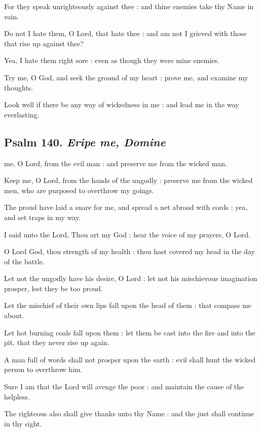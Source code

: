 For they speak unrighteously against thee : and thine enemies take thy Name in vain.\par
{}Do not I hate them, O Lord, that hate thee : and am not I grieved with those that rise up against thee?\par
{}Yea, I hate them right sore : even as though they were mine enemies.\par
{}Try me, O God, and seek the ground of my heart : prove me, and examine my thoughts.\par
{}Look well if there be any way of wickedness in me : and lead me in the way everlasting.\par

\subsection{Psalm 140. \textit{Eripe me, Domine}}

 me, O Lord, from the evil man : and preserve me from the wicked man.\par
{}
Keep me, O Lord, from the hands of the ungodly : preserve me from the wicked men, who are purposed to overthrow my goings.\par
{}The proud have laid a snare for me, and spread a net abroad with cords : yea, and set traps in my way.\par
{}I said unto the Lord, Thou art my God : hear the voice of my prayers, O Lord.\par
{}O Lord God, thou strength of my health : thou hast covered my head in the day of the battle.\par
{}Let not the ungodly have his desire, O Lord : let not his mischievous imagination prosper, lest they be too proud.\par
{}Let the mischief of their own lips fall upon the head of them : that compass me about.\par
{}Let hot burning coals fall upon them : let them be cast into the fire and into the pit, that they never rise up again.\par
{}A man full of words shall not prosper upon the earth : evil shall hunt the wicked person to overthrow him.\par
{}Sure I am that the Lord will avenge the poor : and maintain the cause of the helpless.\par
{}The righteous also shall give thanks unto thy Name : and the just shall continue in thy sight.\par

